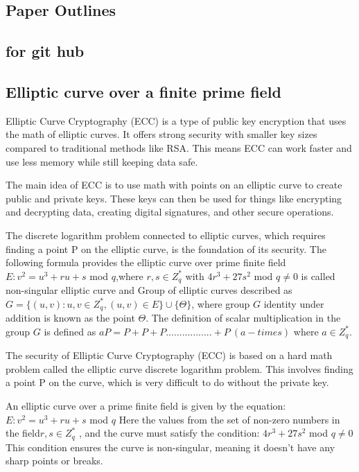 \documentclass[3p,times,onecolumn]{elsarticle}
\begin{document}
\subsection{\textbf{Paper Outlines}}


\subsection{\textbf{for git hub}}








\subsection{\textbf{Elliptic curve over a finite prime field }}


Elliptic Curve Cryptography (ECC) is a type of public key encryption that uses the math of elliptic curves. It offers strong security with smaller key sizes compared to traditional methods like RSA. This means ECC can work faster and use less memory while still keeping data safe.

The main idea of ECC is to use math with points on an elliptic curve to create public and private keys. These keys can then be used for things like encrypting and decrypting data, creating digital signatures, and other secure operations.

The discrete logarithm problem connected to elliptic curves, which requires finding a point P on the elliptic curve, is the foundation of its security.
The following formula provides the elliptic curve over prime finite field $E: v^2=u^3+ru+s$ mod $q$,where $r,s\in Z_{q}^{*}$ with $4r^3+27s^2$ mod $q\neq0$ is called non-singular elliptic curve and Group of elliptic curves described as $G=\{(u,v): u,v\in Z_{q}^{*}, (u,v)\in E\}\cup \{\Theta\}$, where group $G$ identity under addition is known as the point $\Theta$. The definition of scalar multiplication in the group $G$ is defined as $aP=P+P+P.................+P~(a-times)$ where $a\in Z_{q}^{*}$.


The security of Elliptic Curve Cryptography (ECC) is based on a hard math problem called the elliptic curve discrete logarithm problem. This involves finding a point P on the curve, which is very difficult to do without the private key.

An elliptic curve over a prime finite field is given by the equation:
$E: v^2=u^3+ru+s$ mod $q$
Here the values from the set of non-zero numbers in the field$r,s\in Z_{q}^{*}$ , and the curve must satisfy the condition:
$4r^3+27s^2$ mod $q\neq0$
This condition ensures the curve is non-singular, meaning it doesn’t have any sharp points or breaks.
\end{document}
